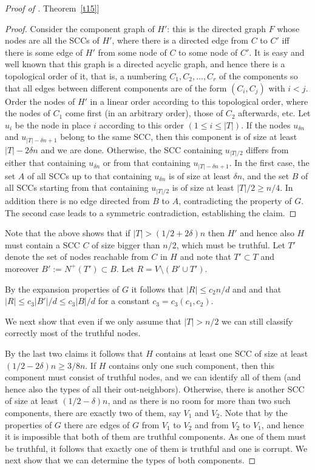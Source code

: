 \documentclass[11pt]{article}
\numberwithin{equation}{section}
\theoremstyle{definition}
\theoremstyle{plain}
\newcommand{\expref}[2]{\hyperref[#2]{#1~\ref{#2}}}
\begin{document}
\begin{proof}[Proof of \expref{Theorem}{t15}]
\begin{proof} Consider the component graph of $H'$: this is the 
directed graph $F$ whose nodes are all the SCCs of 
$H'$, where there is a directed 
edge  from $C$ to $C'$ iff there is some edge of  $H'$ from
some node of $C$ to some node of $C'$.  It is easy and well
known that this graph is a directed acyclic graph, and hence there
is a topological order of it, that is, a numbering
$C_1, C_2, \ldots ,C_r$ of the components  so that all edges
between different components  are of the form $(C_i,C_j)$ with
$i <j$. Order the nodes of $H'$ in a linear order according to
this topological order, where the nodes of $C_1$ come first
(in an arbitrary order),
those of $C_2$ afterwards, etc. Let $u_i$ be the node in place
$i$ according to this order $(1 \leq i \leq |T|)$. If the
nodes $u_{\delta n}$ and $u_{|T|-\delta n+1}$ 
belong to the same SCC, then this component is of size
at least $|T|-2 \delta n$ and we are done. Otherwise, the SCC
containing $u_{|T|/2}$ differs from either that containing
$u_{\delta n}$ or from that containing $u_{|T|-\delta n+1}$.
In the first case, the set $A$ of all SCCs up to that  containing
$u_{\delta n}$ is of size  at least $\delta n$, and the set
$B$ of all SCCs starting from that containing $u_{|T|/2}$ 
is of size at least $|T|/2 \geq n/4$. In addition there is no edge directed
from $B$ to $A$, contradicting the property of $G$. The second case
leads to a symmetric contradiction, establishing the claim.
\end{proof}

Note that the above shows that if $|T|>(1/2+2\delta)n$ then
$H'$ and hence also $H$ must contain a SCC $C$ of size bigger than
$n/2$, which must be truthful.  Let $T'$ denote the set of nodes
reachable from $C$ in $H$ and note that $T' \subset T$ and moreover
$B' := N^{+}(T') \subset B$.
Let  $R = V \setminus (B' \cup T')$. 

By the expansion properties of $G$ it follows that 
$|R| \leq c_2 n / d$ and 
and that $|R| \leq c_3 |B'|/d \leq c_3 |B|/d$ 
for a constant $c_3=c_3(c_1,c_2)$. 

We next show that even if we only
assume that $|T|>n/2$ we can still classify correctly most of the
truthful nodes. 

By the last two claims it follows that $H$ contains at least one
SCC of size at least $(1/2-2 \delta)n \geq 3/8 n$.
If $H$ contains only one such component, then this component  
must consist of truthful nodes, and we can identify all of them
(and hence also the types of all their out-neighbors). 
Otherwise, there is another SCC of size at least
$(1/2-\delta)n$, and as there is no room for more than two such
components, there are exactly two of them, say $V_1$ and $V_2$. Note
that by the properties of $G$ there are edges of $G$ from $V_1$
to $V_2$ and from $V_2$ to $V_1$, 
and hence it is impossible that both of them are
truthful components.  As one of them must be truthful, it follows
that exactly one  of them is truthful  and one is corrupt.
We next show that we can determine the types of both
components.


\end{proof}
\end{document}
